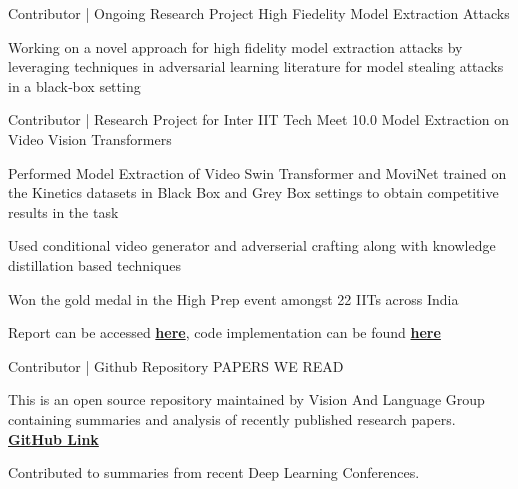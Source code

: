 
\begin{cventries}


\cventry
{Contributor | Ongoing Research Project} %
{High Fiedelity Model Extraction Attacks} %
{} %
{} %
{
	\begin{cvitems} %
		\item {Working on a novel approach for high fidelity model extraction attacks by leveraging techniques in adversarial learning literature for model stealing attacks in a black‑box setting}
	\end{cvitems}
}

\cventry
{Contributor | Research Project for Inter IIT Tech Meet 10.0} %
{Model Extraction on Video Vision Transformers} %
{} %
{} %
{
	\begin{cvitems} %
		\item {Performed Model Extraction of Video Swin Transformer and MoviNet trained on the Kinetics datasets in Black Box and Grey Box settings to obtain competitive results in the task}
		\item {Used conditional video generator and adverserial crafting along with knowledge distillation based techniques}
		\item {Won the gold medal in the High Prep event amongst 22 IITs across India}
		\item {Report can be accessed {\href{https://github.com/dsgiitr/BOSCH-MODEL-EXTRACTION-ATTACK-FOR-VIDEO-CLASSIFICATION/blob/master/Documentation/report_final.pdf}{\bf here}}, code implementation can be found {\href{https://github.com/dsgiitr/BOSCH-MODEL-EXTRACTION-ATTACK-FOR-VIDEO-CLASSIFICATION}{\bf here}}} 
	\end{cvitems}
}

\cventry
{Contributor | Github Repository} %
{PAPERS WE READ} %
{} %
{} %
{
	\begin{cvitems} %
		\item {This is an open source repository maintained by Vision And Language Group containing summaries and analysis of recently published research papers. {\href{https://github.com/vlgiitr/papers_we_read}{\bf GitHub Link}}}
		\item {Contributed to summaries from recent Deep Learning Conferences.}
	\end{cvitems}
}



\end{cventries}
